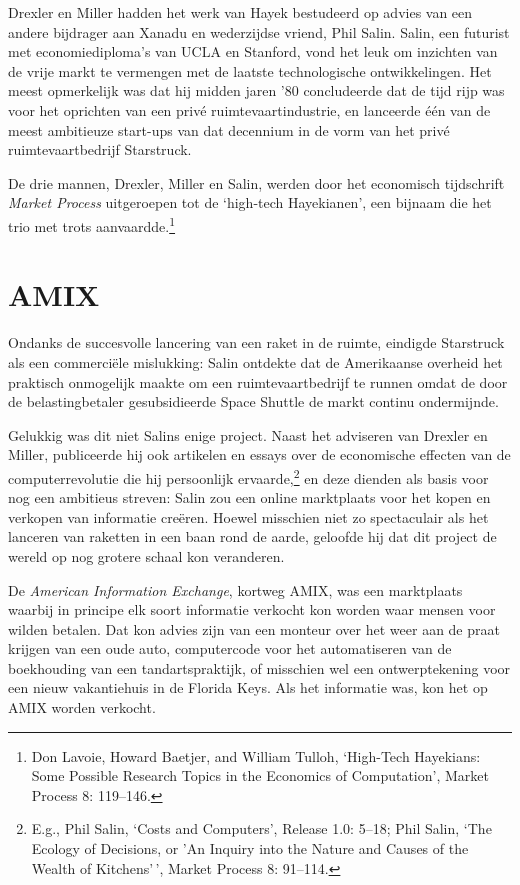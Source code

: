\documentclass[
  a5paper,
  smalldemyvopaper,11pt,twoside,onecolumn,openright,extrafontsizes]{memoir}
\begin{document}
Drexler en Miller hadden het werk van Hayek bestudeerd op advies van een
andere bijdrager aan Xanadu en wederzijdse vriend, Phil Salin. Salin,
een futurist met economiediploma's van UCLA en Stanford, vond het leuk
om inzichten van de vrije markt te vermengen met de laatste
technologische ontwikkelingen. Het meest opmerkelijk was dat hij midden
jaren '80 concludeerde dat de tijd rijp was voor het oprichten van een
privé ruimtevaartindustrie, en lanceerde één van de meest ambitieuze
start-ups van dat decennium in de vorm van het privé ruimtevaartbedrijf
Starstruck.

De drie mannen, Drexler, Miller en Salin, werden door het economisch
tijdschrift \emph{Market Process} uitgeroepen tot de `high-tech
Hayekianen', een bijnaam die het trio met trots aanvaardde.\footnote{Don
  Lavoie, Howard Baetjer, and William Tulloh, `High-Tech Hayekians: Some
  Possible Research Topics in the Economics of Computation', Market
  Process 8: 119--146.}

\section{AMIX}\label{amix}

Ondanks de succesvolle lancering van een raket in de ruimte, eindigde
Starstruck als een commerciële mislukking: Salin ontdekte dat de
Amerikaanse overheid het praktisch onmogelijk maakte om een
ruimtevaartbedrijf te runnen omdat de door de belastingbetaler
gesubsidieerde Space Shuttle de markt continu ondermijnde.

Gelukkig was dit niet Salins enige project. Naast het adviseren van
Drexler en Miller, publiceerde hij ook artikelen en essays over de
economische effecten van de computerrevolutie die hij persoonlijk
ervaarde,\footnote{E.g., Phil Salin, `Costs and Computers', Release 1.0:
  5--18; Phil Salin, `The Ecology of Decisions, or 'An Inquiry into the
  Nature and Causes of the Wealth of Kitchens'\,', Market Process 8:
  91--114.} en deze dienden als basis voor nog een ambitieus streven:
Salin zou een online marktplaats voor het kopen en verkopen van
informatie creëren. Hoewel misschien niet zo spectaculair als het
lanceren van raketten in een baan rond de aarde, geloofde hij dat dit
project de wereld op nog grotere schaal kon veranderen.

De \emph{American Information Exchange}, kortweg AMIX, was een
marktplaats waarbij in principe elk soort informatie verkocht kon worden
waar mensen voor wilden betalen. Dat kon advies zijn van een monteur
over het weer aan de praat krijgen van een oude auto, computercode voor
het automatiseren van de boekhouding van een tandartspraktijk, of
misschien wel een ontwerptekening voor een nieuw vakantiehuis in de
Florida Keys. Als het informatie was, kon het op AMIX worden verkocht.
\end{document}
